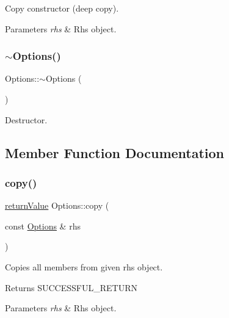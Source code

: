 Copy constructor (deep copy). 
\begin{DoxyParams}{Parameters}
{\em rhs} & Rhs object. \\
\hline
\end{DoxyParams}
\mbox{\label{class_options_a86ddb85b183f8b58af5481f30a42fa92}} 
\subsubsection{\texorpdfstring{$\sim$\+Options()}{~Options()}}
{\footnotesize\ttfamily Options\+::$\sim$\+Options (\begin{DoxyParamCaption}{ }\end{DoxyParamCaption})}

Destructor. 

\subsection{Member Function Documentation}
\mbox{\label{class_options_a095e22d9b8588029781094cccc01e375}} 
\subsubsection{\texorpdfstring{copy()}{copy()}}
{\footnotesize\ttfamily \hyperlink{_message_handling_8hpp_a81d556f613bfbabd0b1f9488c0fa865e}{return\+Value} Options\+::copy (\begin{DoxyParamCaption}\item[{const \hyperlink{class_options}{Options} \&}]{rhs }\end{DoxyParamCaption})\hspace{0.3cm}{\ttfamily [protected]}}

Copies all members from given rhs object. \begin{DoxyReturn}{Returns}
S\+U\+C\+C\+E\+S\+S\+F\+U\+L\+\_\+\+R\+E\+T\+U\+RN 
\end{DoxyReturn}

\begin{DoxyParams}{Parameters}
{\em rhs} & Rhs object. \\
\hline
\end{DoxyParams}
\mbox{\label{class_options_af10ef0a01e3be1db805a3fa4aea094db}} 
